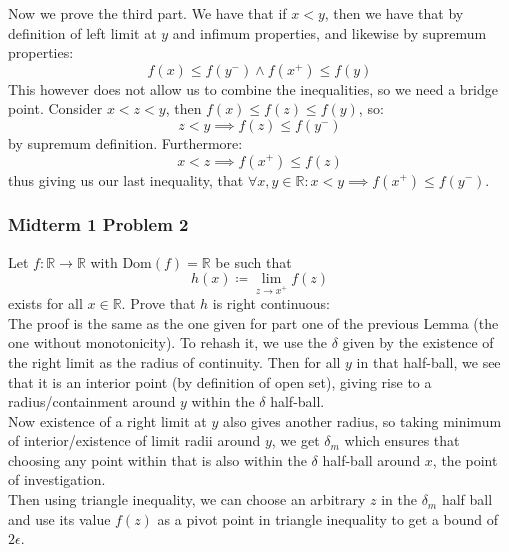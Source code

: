 \documentclass[10pt,letterpaper]{article} %
\begin{document}
Now we prove the third part. We have that if $x < y$, then we have that by definition of left limit at $y$ and infimum properties, and likewise by supremum properties:
\begin{equation*}
f(x) \leqslant f(y^-) \land f(x^+) \leqslant f(y)
\end{equation*}
This however does not allow us to combine the inequalities, so we need a bridge point. Consider $x < z < y$, then $f(x) \leqslant f(z) \leqslant f(y)$, so:
\begin{equation*}
z < y \implies f(z) \leqslant f(y^-)
\end{equation*}
by supremum definition. Furthermore:
\begin{equation*}
x < z \implies f(x^+) \leqslant f(z)
\end{equation*}
thus giving us our last inequality, that $\forall x, y \in \mathbb{R}: x < y \implies f(x^+) \leqslant f(y^-)$.

\subsubsection{Midterm 1 Problem 2}
Let $f: \mathbb{R} \xrightarrow{} \mathbb{R}$ with $\text{Dom}(f) = \mathbb{R}$ be such that
\begin{equation*}
  h(x) \coloneq \lim_{z \xrightarrow{} x^+} f(z)
\end{equation*}
exists for all $x \in \mathbb{R}$. Prove that $h$ is right continuous:\\

The proof is the same as the one given for part one of the previous Lemma (the one without monotonicity). To rehash it, we use the $\delta$ given by the existence of the right limit as the radius of continuity. Then for all $y$ in that half-ball, we see that it is an interior point (by definition of open set), giving rise to a radius/containment around $y$ within the $\delta$ half-ball.\\

Now existence of a right limit at $y$ also gives another radius, so taking minimum of interior/existence of limit radii around $y$, we get $\delta_m$ which ensures that choosing any point within that is also within the $\delta$ half-ball around $x$, the point of investigation.\\

Then using triangle inequality, we can choose an arbitrary $z$ in the $\delta_m$ half ball and use its value $f(z)$ as a pivot point in triangle inequality to get a bound of $2\epsilon$.\\
\end{document}
